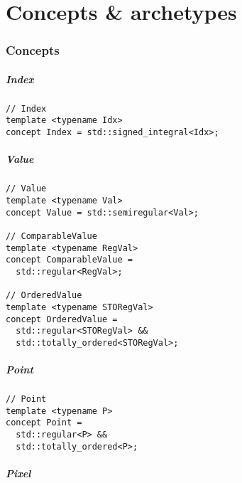 \chapter{Concepts \& archetypes}
\label{appendix.concepts.and.archetypes}

\subsection{Concepts}

\paragraph{Index}

\begin{verbatim}
// Index
template <typename Idx>
concept Index = std::signed_integral<Idx>;
\end{verbatim}


\paragraph{Value}

\begin{verbatim}
// Value
template <typename Val>
concept Value = std::semiregular<Val>;

// ComparableValue
template <typename RegVal>
concept ComparableValue =
  std::regular<RegVal>;

// OrderedValue
template <typename STORegVal>
concept OrderedValue =
  std::regular<STORegVal> &&
  std::totally_ordered<STORegVal>;
\end{verbatim}


\paragraph{Point}

\begin{verbatim}
// Point
template <typename P>
concept Point =
  std::regular<P> &&
  std::totally_ordered<P>;
\end{verbatim}


\paragraph{Pixel}

